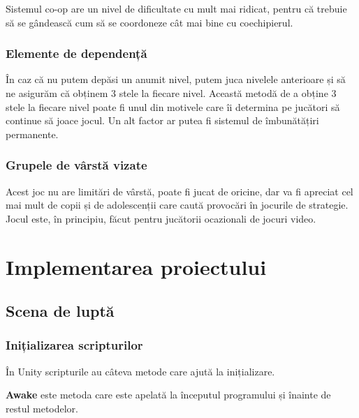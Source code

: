 \documentclass[12pt, a4paper]{article}
\begin{document}
	Sistemul co-op are un nivel de dificultate cu mult mai ridicat, pentru că trebuie să se gândească cum să se coordoneze cât mai bine cu coechipierul.
	
	
	
	
	
	\subsubsection{Elemente de dependență}
	
	În caz că nu putem depăsi un anumit nivel, putem juca nivelele anterioare și să ne asigurăm că obținem 3 stele la fiecare nivel. Această metodă de a obține 3 stele la fiecare nivel poate fi unul din motivele care îi determina pe jucători să continue să joace jocul. Un alt factor ar putea fi sistemul de îmbunătățiri permanente.
	
	
	
	
	
	\subsubsection{Grupele de vârstă vizate}
	
	Acest joc nu are limitări de vârstă, poate fi jucat de oricine, dar va fi apreciat cel mai mult de copii și de adolescenții care caută provocări în jocurile de strategie. Jocul este, în principiu, făcut pentru jucătorii ocazionali de jocuri video.
	
	
	
	
	
	\section{Implementarea proiectului}
	\label{section: projectImplementation}
	
	\subsection{Scena de luptă}
	
	\subsubsection{Inițializarea scripturilor}
	\label{section: initialization}
	
	În Unity scripturile au câteva metode care ajută la inițializare.
	\newline
	
	\textbf{Awake} este metoda care este apelată la începutul programului și înainte de restul metodelor.
	\newline
	
\end{document}
